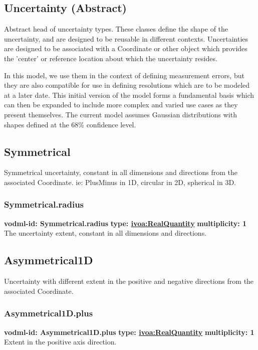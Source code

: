   \subsection{Uncertainty (Abstract)}
  \label{sect:Uncertainty}
    Abstract head of uncertainty types. These classes define the shape of the uncertainty, and are designed to be reusable in different contexts. Uncertainties are designed to be associated with a Coordinate or other object which provides the 'center' or reference location about which the uncertainty resides. 

In this model, we use them in the context of defining measurement errors, but they are also compatible for use in defining resolutions which are to be modeled at a later date. This initial version of the model forms a fundamental basis which can then be expanded to include more complex and varied use cases as they present themselves. The current model assumes Gaussian distributions with shapes defined at the 68\% confidence level.

  \subsection{Symmetrical}
  \label{sect:Symmetrical}
    Symmetrical uncertainty, constant in all dimensions and directions from the associated Coordinate. ie: PlusMinus in 1D, circular in 2D, spherical in 3D.

    \subsubsection{Symmetrical.radius}
      \textbf{vodml-id: Symmetrical.radius} \newline
      \textbf{type: \hyperref[sect:ivoa]{ivoa:RealQuantity}} \newline
      \textbf{multiplicity: 1} \newline 
      The uncertainty extent, constant in all dimensions and directions.

  \subsection{Asymmetrical1D}
  \label{sect:Asymmetrical1D}
    Uncertainty with different extent in the positive and negative directions from the associated Coordinate.

    \subsubsection{Asymmetrical1D.plus}
      \textbf{vodml-id: Asymmetrical1D.plus} \newline
      \textbf{type: \hyperref[sect:ivoa]{ivoa:RealQuantity}} \newline
      \textbf{multiplicity: 1} \newline 
      Extent in the positive axis direction.

